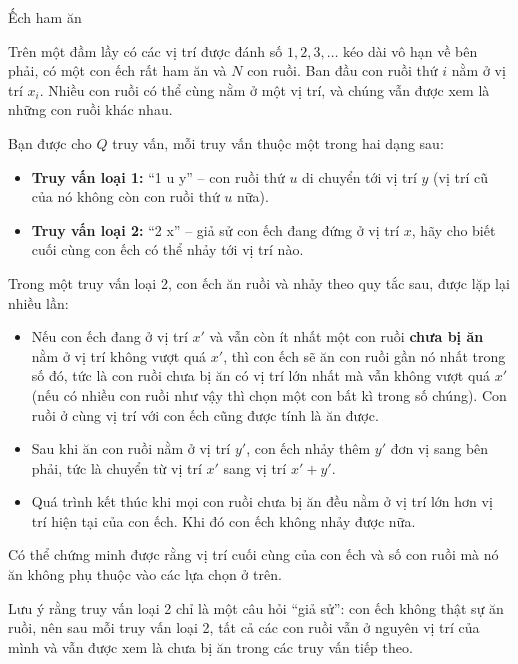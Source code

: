 \documentclass[11pt, a4paper, oneside]{article}
\begin{document}
\begin{problem}[input = jumping-frog.inp, output = jumping-frog.out, time = 2, memory = 512]{Ếch ham ăn}

Trên một đầm lầy có các vị trí được đánh số $1, 2, 3, \ldots$ kéo dài vô hạn về bên phải, có một con ếch rất ham ăn và $N$ con ruồi. Ban đầu con ruồi thứ $i$ nằm ở vị trí $x_i$. Nhiều con ruồi có thể cùng nằm ở một vị trí, và chúng vẫn được xem là những con ruồi khác nhau.

Bạn được cho $Q$ truy vấn, mỗi truy vấn thuộc một trong hai dạng sau:

\begin{itemize}
    \item \textbf{Truy vấn loại 1:} ``1 u y'' -- con ruồi thứ $u$ di chuyển tới vị trí $y$ (vị trí cũ của nó không còn con ruồi thứ $u$ nữa).
    \item \textbf{Truy vấn loại 2:} ``2 x'' -- giả sử con ếch đang đứng ở vị trí $x$, hãy cho biết cuối cùng con ếch có thể nhảy tới vị trí nào.
\end{itemize}

Trong một truy vấn loại 2, con ếch ăn ruồi và nhảy theo quy tắc sau, được lặp lại nhiều lần:

\begin{itemize}
    \item Nếu con ếch đang ở vị trí $x'$ và vẫn còn ít nhất một con ruồi \textbf{chưa bị ăn} nằm ở vị trí không vượt quá $x'$, thì con ếch sẽ ăn con ruồi gần nó nhất trong số đó, tức là con ruồi chưa bị ăn có vị trí lớn nhất mà vẫn không vượt quá $x'$ (nếu có nhiều con ruồi như vậy thì chọn một con bất kì trong số chúng). Con ruồi ở cùng vị trí với con ếch cũng được tính là ăn được.
    \item Sau khi ăn con ruồi nằm ở vị trí $y'$, con ếch nhảy thêm $y'$ đơn vị sang bên phải, tức là chuyển từ vị trí $x'$ sang vị trí $x' + y'$.
    \item Quá trình kết thúc khi mọi con ruồi chưa bị ăn đều nằm ở vị trí lớn hơn vị trí hiện tại của con ếch. Khi đó con ếch không nhảy được nữa.
\end{itemize}

Có thể chứng minh được rằng vị trí cuối cùng của con ếch và số con ruồi mà nó ăn không phụ thuộc vào các lựa chọn ở trên.

Lưu ý rằng truy vấn loại 2 chỉ là một câu hỏi ``giả sử'': con ếch không thật sự ăn ruồi, nên sau mỗi truy vấn loại 2, tất cả các con ruồi vẫn ở nguyên vị trí của mình và vẫn được xem là chưa bị ăn trong các truy vấn tiếp theo.


\end{problem}
\end{document}
